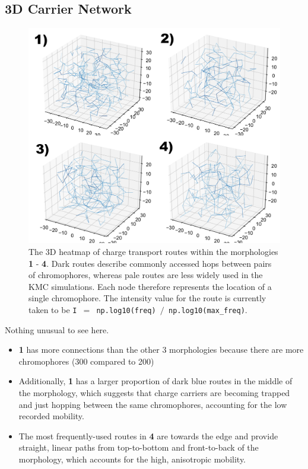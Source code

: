 \documentclass[12pt]{article}
\begin{document}
\clearpage

\subsection{3D Carrier Network}

\begin{figure}[h!]\centering
	\includegraphics[width=\textwidth]{Figures/3dElectron.pdf}
    \caption{The 3D heatmap of charge transport routes within the morphologies \textbf{1} - \textbf{4}.
    Dark routes describe commonly accessed hops between pairs of chromophores, whereas pale routes are less widely used in the KMC simulations.
    Each node therefore represents the location of a single chromophore.
The intensity value for the route is currently taken to be \texttt{I $=$ np.log10(freq) $/$ np.log10(max\_freq)}.}
	\label{fig:3dNetwork}
\end{figure}

Nothing unusual to see here.

\begin{itemize}
    \item{\textbf{1} has more connections than the other 3 morphologies because there are more chromophores (300 compared to 200)}
    \item{Additionally, \textbf{1} has a larger proportion of dark blue routes in the middle of the morphology, which suggests that charge carriers are becoming trapped and just hopping between the same chromophores, accounting for the low recorded mobility.}
    \item{The most frequently-used routes in \textbf{4} are towards the edge and provide straight, linear paths from top-to-bottom and front-to-back of the morphology, which accounts for the high, anisotropic mobility.}
\end{itemize}
\end{document}
